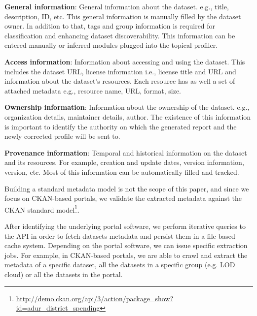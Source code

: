 \documentclass[runningheads,a4paper]{../../Util/LaTEX/llncs}
\begin{document}
\textbf{General information}: General information about the dataset. e.g., title, description, ID, etc. This general information is manually filled by the dataset owner. In addition to that, tags and group information is required for classification and enhancing dataset discoverability. This information can be entered manually or inferred modules plugged into the topical profiler.

\textbf{Access information}: Information about accessing and using the dataset. This includes the dataset URL, license information i.e., license title and URL and information about the dataset's resources. Each resource has as well a set of attached metadata e.g., resource name, URL, format, size.

\textbf{Ownership information}: Information about the ownership of the dataset. e.g., organization details, maintainer details, author. The existence of this information is important to identify the authority on which the generated report and the newly corrected profile will be sent to.

\textbf{Provenance information}: Temporal and historical information on the dataset and its resources. For example, creation and update dates, version information, version, etc. Most of this information can be automatically filled and tracked.

Building a standard metadata model is not the scope of this paper, and since we focus on CKAN-based portals, we validate the extracted metadata against the CKAN standard model\footnote{\url{http://demo.ckan.org/api/3/action/package\_show?id=adur\_district\_spending}}.

After identifying the underlying portal software, we perform iterative queries to the API in order to fetch datasets metadata and persist them in a file-based cache system. Depending on the portal software, we can issue specific extraction jobs. For example, in CKAN-based portals, we are able to crawl and extract the metadata of a specific dataset, all the datasets in a specific group (e.g. LOD cloud) or all the datasets in the portal.
\end{document}
